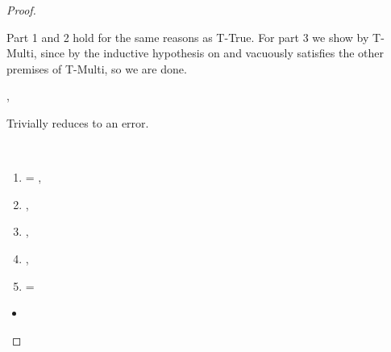 \begin{lemma}
\begin{proof}
\begin{case}[B-DefMulti]
\begin{itemize}
\begin{subcase}[T-DefMulti]
Part 1 and 2 hold for the same reasons as T-True.
For part 3 we show 
by T-Multi, since \judgementtwo {} {} {} by the inductive hypothesis on {}
and {\emptydisptable} vacuously satisfies the other premises of T-Multi, so we are done.

\end{subcase}
\end{itemize}
\end{case}

\begin{case}[BE-DefMulti] \opsem {\openv{}} {} {\errorvalv{}},
        \opsem {\openv{}} {\e{}} {\errorvalv{}}

        Trivially reduces to an error.

\end{case}

\begin{case}[B-DefMethod]

        \ 

        \begin{enumerate}
          \item
       \val{} = { {\disptablep{}}},
          \item
        \opsem {\openv{}}
               {}
               { {\disptable{}}},
          \item
  \opsem {\openv{}}
         {}
         {},
          \item
  \opsem {\openv{}}
         {}
         {},
          \item
         \disptablep{} = {\extenddisptable {\disptable{}} 
                                {}
                                {}}
        \end{enumerate}

  \begin{itemize}
    \item[]
      \begin{subcase}[T-DefMethod]
        \ 
        
        \begin{enumerate}[resume]


\end{enumerate}
\end{subcase}
\end{itemize}
\end{case}
\end{proof}
\end{lemma}
